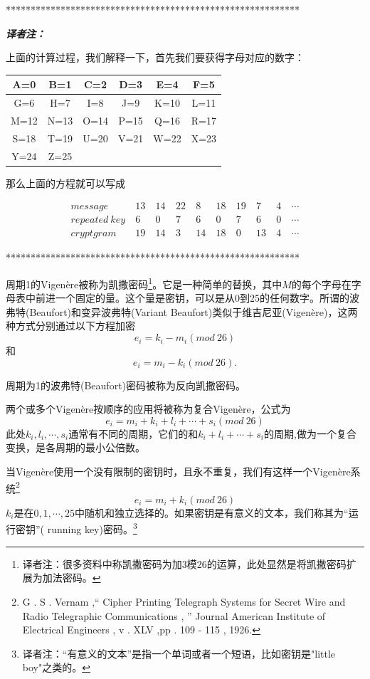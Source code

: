 \documentclass[]{article}
\begin{document}
\vspace{1cm}
***********************************************************\par
\textsl{\textbf{译者注：}}\par
上面的计算过程，我们解释一下，首先我们要获得字母对应的数字：\par
\begin{tabular}{|c|c|c|c|c|c|}
	\hline 
	A=0& B=1 & C=2 & D=3 & E=4 & F=5 \\ 
	\hline 
	G=6& H=7 & I=8 & J=9 & K=10 & L=11 \\ 
	\hline 
	M=12& N=13 & O=14 & P=15 & Q=16 & R=17 \\ 
	\hline 
	S=18& T=19 & U=20 & V=21 & W=22 & X=23 \\ 
	\hline 
	Y=24& Z=25 &  &  &  &  \\ 
	\hline 
\end{tabular} 
\par
那么上面的方程就可以写成\par
\begin{equation}
\begin{aligned}
message\ &13\ &14\    &22\ &8\ &18\ &19\ &7\ &4\ &\cdots\\
repeated\ key\ &6\ &0\ &7\ &6\ &0\ &7\   &6\ &0\ &\cdots\\
cryptgram\ &19\ &14\   &3\ &14\ &18\ &0\ &13\ &4\ &\cdots\nonumber
\end{aligned}
\end{equation}

\par
***********************************************************\par

周期1的Vigen\`{e}re被称为凯撒密码\footnote{译者注：很多资料中称凯撒密码为加3模26的运算，此处显然是将凯撒密码扩展为加法密码。}。它是一种简单的替换，其中$M$的每个字母在字母表中前进一个固定的量。这个量是密钥，可以是从0到25的任何数字。所谓的波弗特(Beaufort)和变异波弗特(Variant Beaufort)类似于维吉尼亚(Vigen\`{e}re)，这两种方式分别通过以下方程加密
\[e_i=k_i-m_i(mod\ 26)\]
和
\[e_i=m_i-k_i(mod\ 26).\]

周期为1的波弗特(Beaufort)密码被称为反向凯撒密码。

两个或多个Vigen\`{e}re按顺序的应用将被称为复合Vigen\`{e}re，公式为
\[e_i=m_i+k_i+l_i+\cdots + s_i(mod\ 26)\]
此处$k_i,l_i,\cdots,s_i$通常有不同的周期，它们的和$k_i+l_i+\cdots+s_i$的周期,做为一个复合变换，是各周期的最小公倍数。

当Vigen\`{e}re使用一个没有限制的密钥时，且永不重复，我们有这样一个Vigen\`{e}re系统\footnote{G . S . Vernam ,“ Cipher Printing Telegraph Systems for Secret Wire and Radio Telegraphic Communications , ” Journal American Institute of Electrical Engineers , v . XLV ,pp . 109 - 115 , 1926.}
\[e_i=m_i+k_i(mod\ 26)\]
$k_i$是在$0,1,\cdots,25$中随机和独立选择的。如果密钥是有意义的文本，我们称其为“运行密钥”( running key)密码。\footnote{译者注：“有意义的文本”是指一个单词或者一个短语，比如密钥是"little boy"之类的。}
\end{document}
